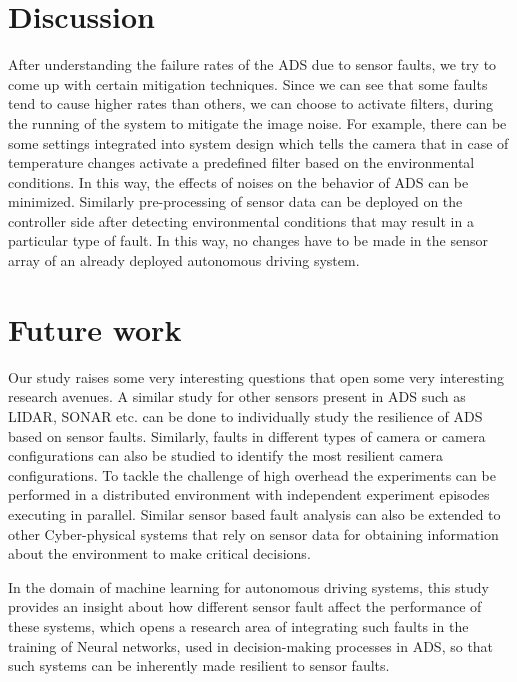  \section{Discussion}

After understanding the failure rates of the ADS due to sensor faults, we try to come up with certain mitigation techniques. Since we can see that some faults tend to cause higher rates than others, we can choose to activate filters, during the running of the system to mitigate the image noise. For example, there can be some settings integrated into system design which tells the camera that in case of temperature changes activate a predefined filter based on the environmental conditions. In this way, the effects of noises on the behavior of ADS can be minimized. Similarly pre-processing of sensor data can be deployed on the controller side after detecting environmental conditions that may result in a particular type of fault. In this way, no changes have to be made in the sensor array of an already deployed autonomous driving system.

\section{Future work}
Our study raises some very interesting questions that open some very interesting research avenues. A similar study for other sensors present in ADS such as LIDAR, SONAR etc. can be done to individually study the resilience of ADS based on sensor faults. Similarly, faults in different types of camera or camera configurations can also be studied to identify the most resilient camera configurations. To tackle the challenge of high overhead the experiments can be performed in a distributed environment with independent experiment episodes executing in parallel. Similar sensor based fault analysis can also be extended to other Cyber-physical systems that rely on sensor data for obtaining information about the environment to make critical decisions. 

In the domain of machine learning for autonomous driving systems, this study provides an insight about how different sensor fault affect the performance of these systems, which opens a research area of integrating such faults in the training of Neural networks, used in decision-making processes in ADS, so that such systems can be inherently made resilient to sensor faults.
